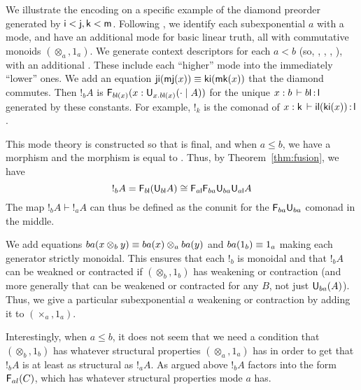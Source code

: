 We illustrate the encoding on a specific example of the diamond preorder
generated by $\mathsf{i} < \mathsf{j},\mathsf{k} < \mathsf{m}$.  Following
\citep[Example 4.3]{reed09adjoint}, we identify each subexponential $a$
with a mode, and have an additional mode  for basic linear truth,
all with commutative monoids $(\otimes_a,1_a)$.  We generate context
descriptors  for each $a < b$ (so, ,
, , ), with an additional .  These include each ``higher'' mode into the
immediately ``lower'' ones.  We add an equation $\mathsf{ji}(\mathsf{mj}(x))
\equiv \mathsf{ki}(\mathsf{mk}(x))$ that the diamond commutes.  Then $!_b A$ is
$\mathsf{F}_{b{\mathsf{l}}(x)}(x : \mathsf{U}_{x.b\mathsf{l}(x)}(\cdot \mid A))$ for the unique
$x : b \, \vdash b{\mathsf{l}} \, \mathit{:} \, \mathsf{l}$ generated by these constants.  For
example, $!_k$ is the comonad of $x :
  \mathsf{k} \, \vdash \mathsf{il}(\mathsf{ki}(x)) \, \mathit{:} \, \mathsf{l}$.

This mode theory is constructed so that  is final, and when $a
\le b$, we have a morphism  and the morphism
 is equal to
.  Thus, by
Theorem~\ref{thm:fusion}, we have
\[
!_b A = \mathsf{F}_{{b\mathsf{l}}}(\mathsf{U}_{{b\mathsf{l}}} A) \cong \mathsf{F}_{{a\mathsf{l}}}\mathsf{F}_{{ba}} \mathsf{U}_{{ba}} \mathsf{U}_{{a\mathsf{l}}} A
\]
The map $!_b A \vdash !_a A$ can thus be defined as the conunit for the
$\mathsf{F}_{{ba}} \mathsf{U}_{{ba}}$ comonad in the middle.

We add equations $ba(x \otimes_b y) \equiv ba(x) \otimes_a ba(y)$ and
$ba(1_b) \equiv 1_a$ making each generator strictly monoidal.  This
ensures that each $!_b$ is monoidal and that $!_b A$ can be weakned or
contracted if $(\otimes_b,1_b)$ has weakening or contraction (and more
generally that  can be weakened or contracted for any $B$, not
just $\mathsf{U}_{ba}{(A)}$).  Thus, we give a particular subexponential
$a$ weakening or contraction by adding it to $(\times_a,1_a)$.  

Interestingly, when $a \le b$, it does not seem that we need a condition
that $(\otimes_b,1_b)$ has whatever structural properties
$(\otimes_a,1_a)$ has in order to get that $!_b A$ is at least as
structural as $!_a A$.  As argued above $!_b A$ factors into the form
$\mathsf{F}_{al}(C)$, which has whatever structural properties mode $a$ has.

